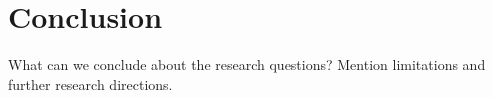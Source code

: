 \chapter{Conclusion}

What can we conclude about the research questions? Mention limitations and further research directions.
